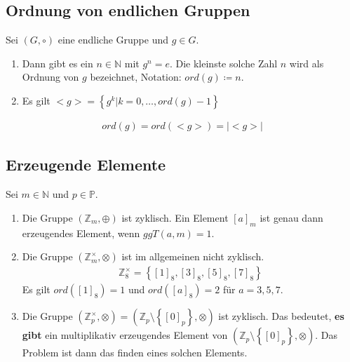\subsection{Ordnung von endlichen Gruppen}
Sei $(G, \circ)$ eine endliche Gruppe und $g\in G$.
\begin{enumerate}
    \item Dann gibt es ein $n\in \mathbb{N}$ mit $g^n=e$.
    Die kleinste solche Zahl $n$ wird als Ordnung von $g$ bezeichnet, Notation: $ord(g)\coloneqq n$.
    \item Es gilt $<g>=\left\{ g^k|k=0,\dots,ord(g)-1 \right\}$
\end{enumerate}
\begin{align}
    ord(g)=ord(<g>)=|<g>|
\end{align}
\subsection{Erzeugende Elemente}
Sei $m\in \mathbb{N}$ und $p\in \mathbb{P}$.
\begin{enumerate}
    \item Die Gruppe $(\mathbb{Z}_m, \oplus)$ ist zyklisch.
    Ein Element $[a]_m$ ist genau dann erzeugendes Element, wenn $ggT(a,m)=1$.
    \item Die Gruppe $(\mathbb{Z}_m^\times, \otimes)$ ist im allgemeinen nicht zyklisch.
    \begin{align}
        \mathbb{Z}_8^\times=\left\{ [1]_8, [3]_8, [5]_8, [7]_8\right\}
    \end{align}
    Es gilt $ord([1]_8)=1$ und $ord([a]_8)=2$ für $a=3,5,7$.
    \item Die Gruppe $(\mathbb{Z}_p^\times, \otimes)=(\mathbb{Z}_p \setminus \left\{ [0]_p\right\}, \otimes)$ ist zyklisch.
    Das bedeutet, \textbf{es gibt} ein multiplikativ erzeugendes Element von $(\mathbb{Z}_p\setminus \left\{ [0]_p \right\}, \otimes)$.
    Das Problem ist dann das finden eines solchen Elements.
\end{enumerate}